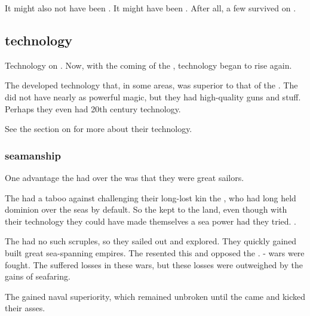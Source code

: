 It might also not have been \dragons. 
It might have been . 
After all, a few \voyagers survived on \Miith{}. 









\subsection{\Aryoth technology}
Technology on \Miith {}. 
Now, with the coming of the \aryothim, technology began to rise again. 

The \aryothim developed technology that, in some areas, was superior to that of the \quiljaaran. 
The \aryothim did not have nearly as powerful magic, but they had high-quality guns and stuff.
Perhaps they even had 20th century technology. 

See the section on  for more about their technology.





\subsubsection{\Aryoth seamanship}
One advantage the \aryothim{} had over the \quiljaaran{} was that they were great sailors. 

The \quiljaaran{} had a taboo against challenging their long-lost kin the \nagae{}, who had long held dominion over the seas by default. 
So the \quiljaaran{} kept to the land, even though with their technology they could have made themselves a sea power had they tried. 
. 

The \aryothim{} had no such scruples, so they sailed out and explored. 
They quickly gained built great sea-spanning empires. 
The \nagae{} resented this and opposed the \aryothim. 
\Naga-\aryoth{} wars were fought. 
The \aryothim{} suffered losses in these wars, but these losses were outweighed by the gains of seafaring. 

The \aryothim{} gained naval superiority, which remained unbroken until the \dragons came and kicked their asses. 





